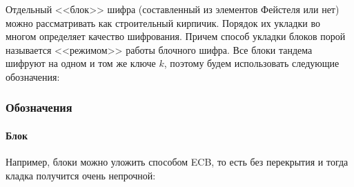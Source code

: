 Отдельный <<блок>> шифра (составленный из элементов Фейстеля или нет) можно рассматривать как строительный кирпичик. Порядок их укладки во многом определяет качество шифрования. Причем способ укладки блоков порой называется <<режимом>> работы блочного шифра. Все блоки тандема шифруют на одном и том же ключе $k$, поэтому будем использовать следующие обозначения:

\begin{frame}
    \frametitle{Обозначения}
    \framesubtitle{Блок}
    
    \begin{figure}
        \begin{center}
        \end{center}
    \end{figure} 
\end{frame}

Например, блоки можно уложить способом ECB, то есть без перекрытия и тогда кладка получится очень непрочной:

